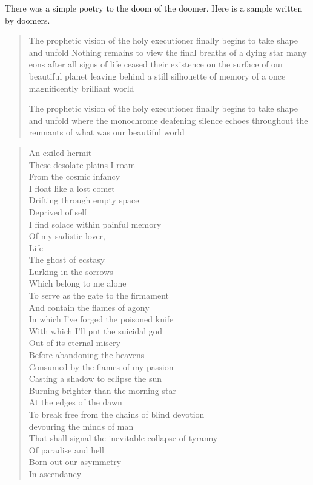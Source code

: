 \documentclass[../report.tex]{subfiles}
\begin{document}
There was a simple poetry to the doom of the doomer. Here is a sample written by doomers.

\begin{quotation}
    The prophetic vision of the holy executioner finally begins to take shape and unfold
    Nothing remains to view the final breaths of a dying star many eons after all signs
    of life ceased their existence on the surface of our beautiful planet
    leaving behind a still silhouette of memory of a once magnificently brilliant world

    The prophetic vision of the holy executioner finally begins to take shape and unfold
    where the monochrome deafening silence echoes throughout the remnants of what was our beautiful world
\end{quotation}

\begin{multicols}{2}
	\begin{quotation}
		\noindent
		An exiled hermit\\
		These desolate plains I roam\\
		From the cosmic infancy\\
		I float like a lost comet\\
		Drifting through empty space\\
		Deprived of self\\
		I find solace within painful memory\\
		Of my sadistic lover,\\
		Life\\
		The ghost of ecstasy\\
		Lurking in the sorrows\\
		Which belong to me alone\\
		To serve as the gate to the firmament\\
		And contain the flames of agony\\
		In which I've forged the poisoned knife\\
		With which I'll put the suicidal god\\
		Out of its eternal misery\\
		Before abandoning the heavens\\
		Consumed by the flames of my passion\\
		Casting a shadow to eclipse the sun\\
		Burning brighter than the morning star\\
		At the edges of the dawn\\
		To break free from the chains of blind devotion\\
		devouring the minds of man\\
		That shall signal the inevitable collapse of tyranny\\
		Of paradise and hell\\
		Born out our asymmetry\\
		In ascendancy\\
	\end{quotation}
\end{multicols}
\end{document}
